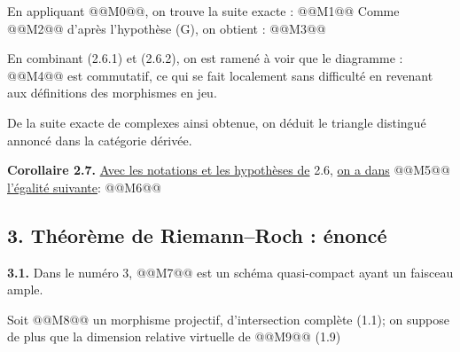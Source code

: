 
En
appliquant @@M0@@, on trouve la suite exacte :
@@M1@@
Comme @@M2@@ d'après l'hypothèse (G), on obtient :
@@M3@@

En combinant (2.6.1) et (2.6.2), on est ramené à voir que le diagramme :
@@M4@@
est commutatif, ce qui se fait localement sans difficulté en revenant aux définitions des morphismes en jeu.

De la suite exacte de complexes ainsi obtenue, on déduit le triangle distingué annoncé dans la catégorie dérivée.

\textbf{Corollaire 2.7.} \uline{Avec les notations et les hypothèses de} 2.6, \uline{on a dans} @@M5@@ \uline{l'égalité suivante}:
@@M6@@

\subsection*{3. Théorème de Riemann--Roch : énoncé}

\textbf{3.1.} Dans le numéro 3, @@M7@@ est un schéma quasi-compact ayant un faisceau ample.

Soit @@M8@@ un morphisme projectif, d'intersection complète (1.1); on suppose de plus que la dimension relative virtuelle de @@M9@@ (1.9)

